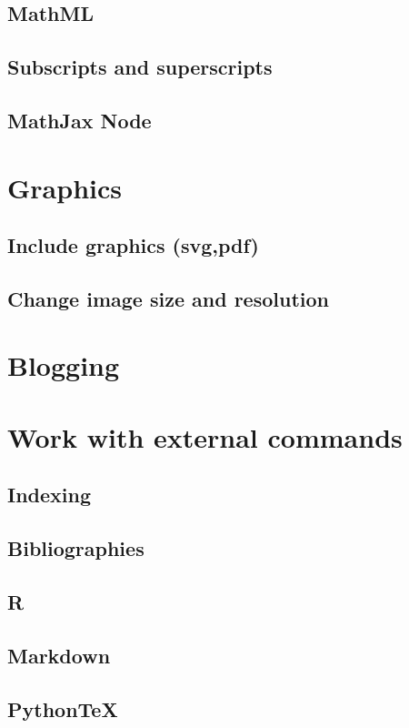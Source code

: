 \documentclass{book}
\begin{document}
\subsection{MathML}
\subsection{Subscripts and superscripts}

\subsection{MathJax Node}


\section{Graphics}
\subsection{Include graphics (svg,pdf)}
\subsection{Change image size and resolution}


\section{Blogging}

\section{Work with external commands}
\subsection{Indexing}
\subsection{Bibliographies}
\subsection{R}
\subsection{Markdown}
\subsection{PythonTeX}
\end{document}
